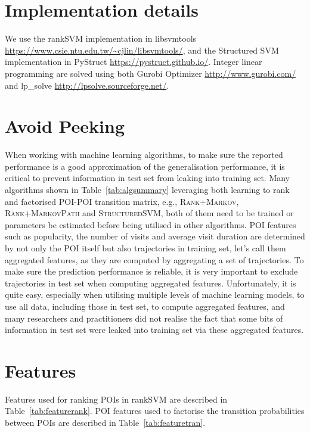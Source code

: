\section{Implementation details}
We use the rankSVM implementation in libsvmtools \url{https://www.csie.ntu.edu.tw/~cjlin/libsvmtools/},
and the Structured SVM implementation in PyStruct \url{https://pystruct.github.io/}.
Integer linear programming are solved using both Gurobi Optimizer \url{http://www.gurobi.com/} 
and lp\_solve \url{http://lpsolve.sourceforge.net/}.


\section{Avoid Peeking}
When working with machine learning algorithms, to make sure the reported performance is a good approximation
of the generalisation performance, it is critical to prevent information in test set from leaking into
training set.
Many algorithms shown in Table~\ref{tab:algsummary} leveraging both learning to rank and 
factorised POI-POI transition matrix,
e.g., \textsc{Rank+Markov}, \textsc{Rank+MarkovPath} and \textsc{StructuredSVM},
both of them need to be trained or parameters be estimated before being utilised in other algorithms.
POI features such as popularity, the number of visits and average visit duration are
determined by not only the POI itself but also trajectories in training set, 
let's call them aggregated features, as they are computed by aggregating a set of trajectories.
To make sure the prediction performance is reliable, 
it is very important to exclude trajectories in test set when computing aggregated features.
Unfortunately, it is quite easy, especially when utilising multiple levels of machine learning models,
to use all data, including those in test set, to compute aggregated features, 
and many researchers and practitioners did not realise the fact that 
some bits of information in test set were leaked into training set via these aggregated features.



\section{Features}
Features used for ranking POIs in rankSVM are described in Table~\ref{tab:featurerank}.
POI features used to factorise the transition probabilities between POIs are described in Table~\ref{tab:featuretran}.


